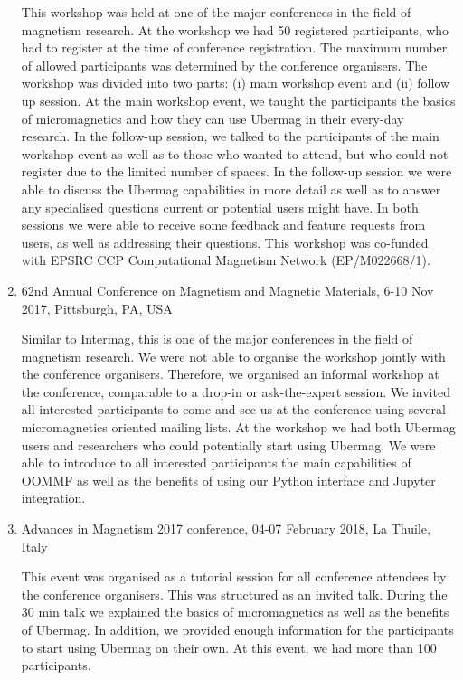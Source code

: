 \documentclass{deliverablereport}
\begin{document}
\begin{enumerate}
  This workshop was held at one of the major conferences in the field
of magnetism research. At the workshop we had 50 registered
participants, who had to register at the time of conference
registration. The maximum number of allowed participants was
determined by the conference organisers. The workshop was divided into
two parts: (i) main workshop event and (ii) follow up session. At the
main workshop event, we taught the participants the basics of
micromagnetics and how they can use Ubermag in their every-day
research. In the follow-up session, we talked to the participants of
the main workshop event as well as to those who wanted to attend, but
who could not register due to the limited number of spaces. In the
follow-up session we were able to discuss the Ubermag capabilities in
more detail as well as to answer any specialised questions current or
potential users might have. In both sessions we were able to receive
some feedback and feature requests from users, as well as addressing
their questions. This workshop was
co-funded with EPSRC CCP Computational Magnetism Network
(EP/M022668/1).

\item 62nd Annual Conference on Magnetism and Magnetic Materials, 6-10
Nov 2017, Pittsburgh, PA, USA

    Similar to Intermag, this is one of the major conferences in the
field of magnetism research. We were not able to organise the workshop
jointly with the conference organisers. Therefore, we organised an
informal workshop at the conference, comparable to a drop-in or
ask-the-expert session. We invited all
interested participants to come and see us at the conference using
several micromagnetics oriented mailing lists. At the workshop we had
both Ubermag users and researchers who could potentially start using
Ubermag. We were able to introduce to all interested participants the
main capabilities of OOMMF as well as the benefits of using our Python
interface and Jupyter integration.

\item Advances in Magnetism 2017 conference, 04-07 February 2018, La Thuile,
Italy

    This event was organised as a tutorial session for all conference
attendees by the conference organisers. This was structured as an
invited talk. During the 30 min talk we explained the basics of
micromagnetics as well as the benefits of Ubermag. In addition, we
provided enough information for the participants to start using
Ubermag on their own. At this event, we had more than 100
participants.


\end{enumerate}
\end{document}
